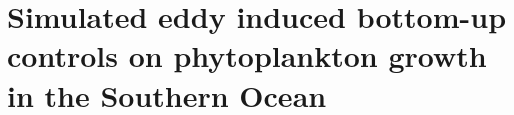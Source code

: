 \chapter{Simulated eddy induced bottom-up controls on phytoplankton growth in the Southern Ocean}
\label{chap:3}
\raggedbottom


\clearpage